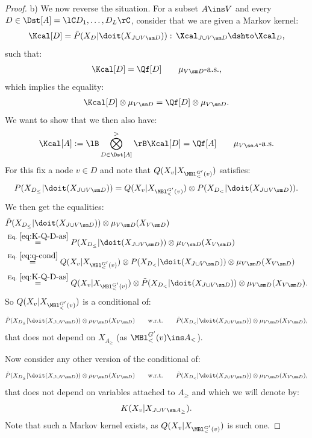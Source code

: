 \begin{Thm}
\begin{proof}
       b) We now reverse the situation. For a subset $A \ins V$ and every $D \in \Dst[A]=\lC D_1,\dots,D_L\rC$, 
       consider that we are given a Markov kernel:
       \[ \Kcal[D]=\tilde P(X_{D}|\doit(X_{J \cup V \sm D})) :\, \Xcal_{J \cup V \sm D} \dshto \Xcal_{D}, \]
        such that:
       \[ \Kcal[D] = \Qf[D]\qquad \mu_{V\sm D}\text{-a.s.,}  \]
       which implies the equality:
        \begin{align}
            \Kcal[D] \otimes \mu_{V\sm D} = \Qf[D]\otimes \mu_{V\sm D}. \label{eq:K-Q-D-as} 
        \end{align}
       We want to show that we then also have:
       \[ \Kcal[A]:= \lB \bigotimes_{D \in \Dst[A]}^> \rB  \Kcal[D] = \Qf[A] \qquad \mu_{V\sm A}\text{-a.s.} \]
       For this fix a node $v \in D$ and note that 
        $Q(X_v|X_{\MBl^{G'}_<(v)})$ satisfies:
        \begin{align} P(X_{D_\le}|\doit(X_{J \cup V \sm D})) = Q(X_v|X_{\MBl^{G'}_<(v)}) \otimes 
            P(X_{D_<}|\doit(X_{J \cup V \sm D})). \label{eq:q-cond}
        \end{align}
        We then get the equalities:
            \begin{align*}
               & \tilde P(X_{D_\le}|\doit(X_{J \cup V \sm D})) \otimes \mu_{V\sm D}(X_{V\sm D}) \\
               &\stackrel{\text{Eq.\ }\ref{eq:K-Q-D-as}}{=}  P(X_{D_\le}|\doit(X_{J \cup V \sm D})) \otimes \mu_{V\sm D}(X_{V\sm D}) \\
               &\stackrel{\text{Eq.\ }\ref{eq:q-cond}}{=}  Q(X_v|X_{\MBl^{G'}_<(v)}) \otimes  P(X_{D_<}|\doit(X_{J \cup V \sm D})) \otimes \mu_{V\sm D}(X_{V\sm D}) \\ 
               &\stackrel{\text{Eq.\ }\ref{eq:K-Q-D-as}}{=}  Q(X_v|X_{\MBl^{G'}_<(v)}) \otimes  \tilde P(X_{D_<}|\doit(X_{J \cup V \sm D})) \otimes \mu_{V\sm D}(X_{V\sm D}). 
            \end{align*}
             So $Q(X_v|X_{\MBl^{G'}_<(v)})$ is a conditional of:
    \[  \tilde P(X_{D_\le}|\doit(X_{J \cup V \sm D})) \otimes \mu_{V\sm D}(X_{V\sm D}) \qquad \text{w.r.t.} \qquad
         \tilde P(X_{D_<}|\doit(X_{J \cup V \sm D}))\otimes \mu_{V\sm D}(X_{V\sm D}), \] 
         that  does not depend on $X_{A_\ge}$ (as $\MBl^{G'}_<(v) \ins A_<$).

      Now consider any other version of the conditional of:
         \[  \tilde P(X_{D_\le}|\doit(X_{J \cup V \sm D})) \otimes \mu_{V\sm D}(X_{V\sm D}) \qquad \text{w.r.t.} \qquad
          \tilde P(X_{D_<}|\doit(X_{J \cup V \sm D}))\otimes \mu_{V\sm D}(X_{V\sm D}), \] 
    that does not depend on variables attached to $A_\ge$ and which we will denote by:
        \[ K(X_v|X_{J \cup V \sm A_\ge}). \]
      Note that such a Markov kernel exists, as $Q(X_v|X_{\MBl^{G'}_<(v)})$ is such one.


\end{proof}
\end{Thm}
